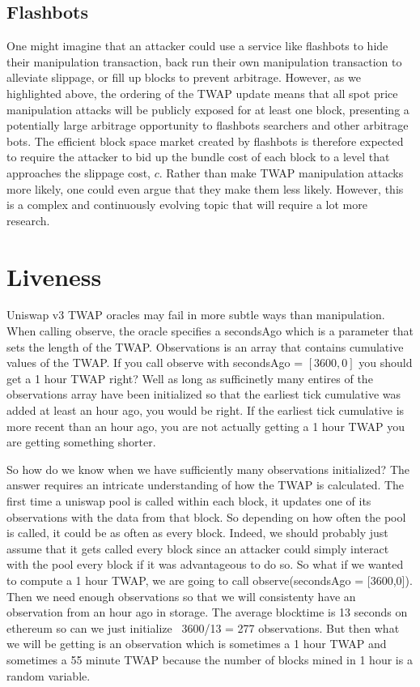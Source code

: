 \documentclass[a4paper, 11pt]{article}
\begin{document}
\subsection{Flashbots}

One might imagine that an attacker could use a service like flashbots to hide their manipulation transaction, back run their own manipulation transaction to alleviate slippage, or fill up blocks to prevent arbitrage. However, as we highlighted above, the ordering of the TWAP update means that all spot price manipulation attacks will be publicly exposed for at least one block, presenting a potentially large arbitrage opportunity to flashbots searchers and other arbitrage bots. The efficient block space market created by flashbots is therefore expected to require the attacker to bid up the bundle cost of each block to a level that approaches the slippage cost, $c$. Rather than make TWAP manipulation attacks more likely, one could even argue that they make them less likely. However, this is a complex and continuously evolving topic that will require a lot more research.

\section{Liveness}

Uniswap v3 TWAP oracles may fail in more subtle ways than manipulation. When calling observe, the oracle specifies a secondsAgo which is a parameter that sets the length of the TWAP. Observations is an array that contains cumulative values of the TWAP. If you call observe with secondsAgo = $[3600,0]$ you should get a 1 hour TWAP right? Well as long as sufficinetly many entires of the observations array have been initialized so that the earliest tick cumulative was added at least an hour ago, you would be right. If the earliest tick cumulative is more recent than an hour ago, you are not actually getting a 1 hour TWAP you are getting something shorter. 

So how do we know when we have sufficiently many observations initialized?
The answer requires an intricate understanding of how the TWAP is calculated.
The first time a uniswap pool is called within each block, it updates one of its observations with the data from that block.
So depending on how often the pool is called, it could be as often as every block.
Indeed, we should probably just assume that it gets called every block since an attacker could simply interact with the pool every block if it was advantageous to do so.
So what if we wanted to compute a 1 hour TWAP, we are going to call observe(secondsAgo = [3600,0]).
Then we need enough observations so that we will consistenty have an observation from an hour ago in storage.
The average blocktime is 13 seconds on ethereum so can we just initialize ~3600/13 = 277 observations.
But then what we will be getting is an observation which is sometimes a 1 hour TWAP and sometimes a 55 minute TWAP because the number of blocks mined in 1 hour is a random variable. 
\end{document}
